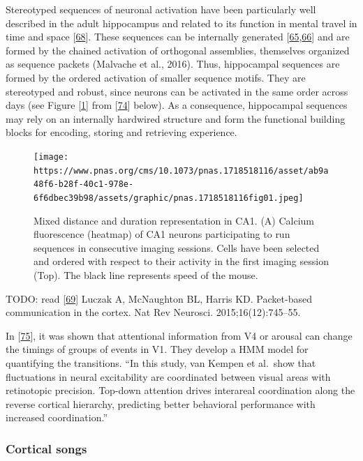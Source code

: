 Stereotyped sequences of neuronal activation have been particularly well described in the adult hippocampus and related to its function in mental travel in time and space {[}\protect\hyperlink{ref-13dQ0R4UM}{68}{]}. These sequences can be internally generated {[}\protect\hyperlink{ref-SVfasyCp}{65},\protect\hyperlink{ref-PUNGVou}{66}{]} and are formed by the chained activation of orthogonal assemblies, themselves organized as sequence packets (Malvache et al., 2016). Thus, hippocampal sequences are formed by the ordered activation of smaller sequence motifs. They are stereotyped and robust, since neurons can be activated in the same order across days (see Figure {[}\ref{fig:haimerl}{]} from {[}\protect\hyperlink{ref-qI2HUEyy}{74}{]} below). As a consequence, hippocampal sequences may rely on an internally hardwired structure and form the functional building blocks for encoding, storing and retrieving experience.

\begin{figure}
\hypertarget{fig:haimerl}{%
\centering
\texttt{[image: https://www.pnas.org/cms/10.1073/pnas.1718518116/asset/ab9a48f6-b28f-40c1-978e-6f6dbec39b98/assets/graphic/pnas.1718518116fig01.jpeg]}
\caption{Mixed distance and duration representation in CA1. (A) Calcium fluorescence (heatmap) of CA1 neurons participating to run sequences in consecutive imaging sessions. Cells have been selected and ordered with respect to their activity in the first imaging session (Top). The black line represents speed of the mouse.}\label{fig:haimerl}
}
\end{figure}

TODO: read {[}\protect\hyperlink{ref-MfmcMsqA}{69}{]} Luczak A, McNaughton BL, Harris KD. Packet-based communication in the cortex. Nat Rev Neurosci. 2015;16(12):745--55.

In {[}\protect\hyperlink{ref-4D8Jnhkz}{75}{]}, it was shown that attentional information from V4 or arousal can change the timings of groups of events in V1. They develop a HMM model for quantifying the transitions. ``In this study, van Kempen et al.~show that fluctuations in neural excitability are coordinated between visual areas with retinotopic precision. Top-down attention drives interareal coordination along the reverse cortical hierarchy, predicting better behavioral performance with increased coordination.''

\hypertarget{cortical-songs}{%
\subsubsection{Cortical songs}\label{cortical-songs}}

